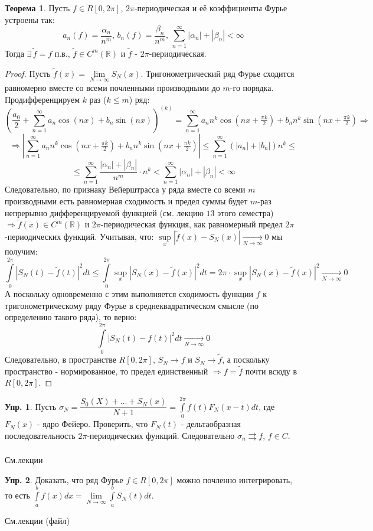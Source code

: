 \documentclass[12pt]{article}
\newcommand{\MR}{\mathbb{R}}
\theoremstyle{definition}
\newtheorem{exrc}{Упр.}
\newtheorem{theorem}{Теорема}
\newcommand{\ddsum}[2]{\displaystyle\sum\limits_{#1}^{#2}}
\newcommand{\ddint}[2]{\displaystyle\int\limits_{#1}^{#2}}
\newcommand{\wte}[1]{\widetilde{#1}}
\newcommand{\uconvm}[2]{\overset{#1}{\underset{#2}{\rightrightarrows}}}
\begin{document}
\begin{theorem}
	Пусть $f\in R[0,2\pi]$,  $2\pi$-периодическая и её коэффициенты Фурье устроены так: 
	$$
		a_n(f) = \dfrac{\alpha_n}{n^m}, \, b_n(f) = \dfrac{\beta_n}{n^m}, \, \ddsum{n = 1}{\infty}|\alpha_n| + |\beta_n| < \infty
	$$
	Тогда $\exists \, \wte{f} = f$ п.в., $\wte{f} \in C^m(\MR)$ и $\wte{f}$ - $2\pi$-периодическая.
\end{theorem}
\begin{proof}
	Пусть $\wte{f}(x) = \lim\limits_{N \to \infty}S_N(x)$. Тригонометрический ряд Фурье сходится равномерно вместе со всеми почленными производными до $m$-го порядка. Продифференцируем $k$ раз ($k \leq m$) ряд:
	$$
		\left(\dfrac{a_0}{2} + \ddsum{n = 1}{\infty}a_n \cos{(nx)} + b_n\sin{(nx)}\right)^{(k)} = \ddsum{n = 1}{\infty}a_n n^k \cos{\left(nx + \tfrac{\pi k}{2}\right)} + b_n n^k \sin{\left(nx + \tfrac{\pi k}{2}\right)} \Rightarrow 
	$$
	$$
		\Rightarrow \left|\ddsum{n = 1}{\infty}a_n n^k \cos{\left(nx + \tfrac{\pi k}{2}\right)} + b_n n^k \sin{\left(nx + \tfrac{\pi k}{2}\right)}\right| \leq \ddsum{n = 1}{\infty}\left(|a_n| + |b_n|\right)n^k \leq
	$$
	$$
		\leq \ddsum{n = 1}{\infty}\dfrac{|\alpha_n| + |\beta_n|}{n^m}{\cdot}n^k < \ddsum{n = 1}{\infty}|\alpha_n| + |\beta_n| < \infty
	$$
	Следовательно, по признаку Вейерштрасса у ряда вместе со всеми $m$ производными есть равномерная сходимость и предел суммы будет $m$-раз непрерывно дифференцируемой функцией (см. лекцию $13$ этого семестра) $\Rightarrow \wte{f}(x) \in C^m(\MR)$ и $2\pi$-периодическая функция, как равномерный предел $2\pi$-периодических функций. Учитывая, что: $\sup\limits_{x}\left|\wte{f}(x) - S_N(x)\right|\xrightarrow[N \to \infty]{} 0 $ мы получим:
	$$ 
		\ddint{0}{2\pi}\left|S_N(t) - \wte{f}(t)\right|^2 dt \leq \ddint{0}{2\pi}\sup\limits_{x}\left|S_N(x) - \wte{f}(x)\right|^2 dt = 2\pi{\cdot}\sup\limits_{x}\left|S_N(x) - \wte{f}(x)\right|^2\xrightarrow[N \to \infty]{} 0
	$$
	А поскольку одновременно с этим выполняется сходимость функции $f$ к тригонометрическому ряду Фурье в среднеквадратическом смысле (по определению такого ряда), то верно:
	$$
		\ddint{0}{2\pi}\left|S_N(t) - f(t)\right|^2 dt \xrightarrow[N \to \infty]{} 0
	$$
	Следовательно, в пространстве $R[0,2\pi], \, S_N \to f$ и $S_N \to \wte{f}$, а поскольку пространство - нормированное, то предел единственный $\Rightarrow f = \wte{f}$ почти всюду в $R[0,2\pi]$.
\end{proof}

\newpage
\begin{exrc}
	Пусть $\sigma_N = \dfrac{S_0(X) + \dotsc + S_N(x)}{N+1} = \ddint{0}{2\pi}f(t)F_N(x-t)dt$, где $F_N(x)$ - ядро Фейеро. Проверить, что $F_N(t)$ - дельтаобразная последовательность $2\pi$-периодических функций. Следовательно $\sigma_n \uconvm{}{}f, \, f\in C$.
\end{exrc}
См.лекции

\begin{exrc}
	Доказать, что ряд Фурье $f \in R[0,2\pi]$ можно почленно интегрировать, то есть $\ddint{a}{b}f(x)dx = \lim\limits_{N \to \infty}\ddint{a}{b}S_N(t)dt$.
\end{exrc}
См.лекции (файл)
\end{document}
